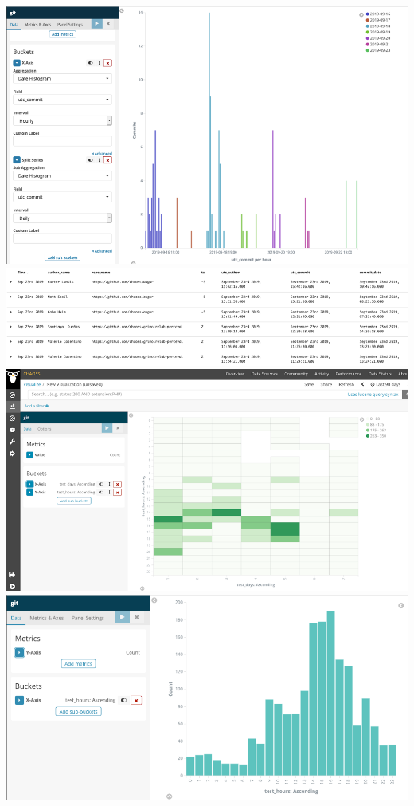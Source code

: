 \includegraphics{images/activity-dates-and-times_1.png}
\includegraphics{images/activity-dates-and-times_2.png}
\includegraphics{images/activity-dates-and-times_3.png}
\includegraphics{images/activity-dates-and-times_4.png}

